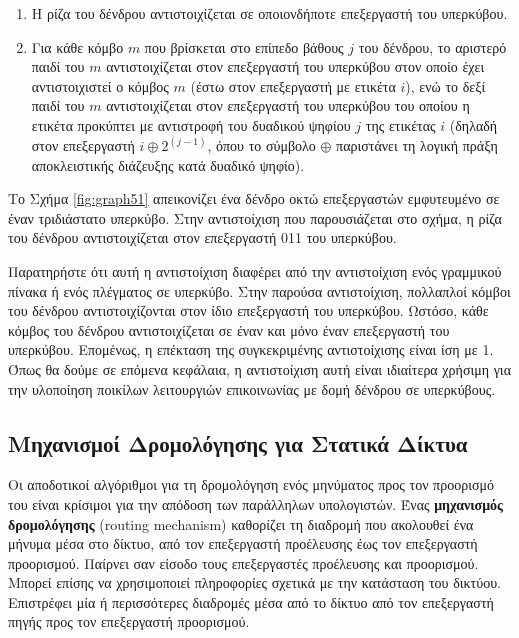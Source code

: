 \documentclass[12pt,a4paper]{article}
\begin{document}
\begin{enumerate}
\item Η ρίζα του δένδρου αντιστοιχίζεται σε οποιονδήποτε επεξεργαστή
του υπερκύβου.

\item Για κάθε κόμβο $m$ που βρίσκεται στο επίπεδο βάθους $j$ του δένδρου, 
το αριστερό παιδί του $m$ αντιστοιχίζεται στον επεξεργαστή του υπερκύβου 
στον οποίο έχει αντιστοιχιστεί ο κόμβος $m$ (έστω στον επεξεργαστή με 
ετικέτα $i$), ενώ το δεξί παιδί του $m$ αντιστοιχίζεται στον επεξεργαστή 
του υπερκύβου του οποίου η ετικέτα προκύπτει με αντιστροφή του δυαδικού 
ψηφίου $j$ της ετικέτας $i$ (δηλαδή στον επεξεργαστή $i \oplus 2^{(j-1)}$,
όπου το σύμβολο $\oplus$ παριστάνει τη λογική πράξη
αποκλειστικής διάζευξης κατά δυαδικό ψηφίο).
\end{enumerate}

\noindent Το Σχήμα \ref{fig:graph51} απεικονίζει ένα δένδρο οκτώ 
επεξεργαστών εμφυτευμένο σε έναν τριδιάστατο υπερκύβο. Στην 
αντιστοίχιση που παρουσιάζεται στο σχήμα, η ρίζα του δένδρου
αντιστοιχίζεται στον επεξεργαστή 011 του υπερκύβου.

Παρατηρήστε ότι αυτή η αντιστοίχιση διαφέρει από την αντιστοίχιση
ενός γραμμικού πίνακα ή ενός πλέγματος σε υπερκύβο. Στην παρούσα 
αντιστοίχιση, πολλαπλοί κόμβοι του δένδρου αντιστοιχίζονται στον ίδιο 
επεξεργαστή του υπερκύβου. Ωστόσο, κάθε κόμβος του δένδρου αντιστοιχίζεται 
σε έναν και μόνο έναν επεξεργαστή του υπερκύβου. Επομένως, η επέκταση 
της συγκεκριμένης αντιστοίχισης είναι ίση με 1. Όπως θα δούμε σε επόμενα 
κεφάλαια, η αντιστοίχιση αυτή είναι ιδιαίτερα χρήσιμη για την υλοποίηση 
ποικίλων λειτουργιών επικοινωνίας με δομή δένδρου σε υπερκύβους.

\subsection{Μηχανισμοί Δρομολόγησης για Στατικά Δίκτυα}
Οι αποδοτικοί αλγόριθμοι για τη δρομολόγηση ενός μηνύματος προς τον
προορισμό του είναι κρίσιμοι για την απόδοση των παράλληλων υπολογιστών.
Ένας \textbf{μηχανισμός δρομολόγησης} (\foreignlanguage{english}{routing mechanism})
καθορίζει τη διαδρομή που ακολουθεί ένα μήνυμα μέσα στο δίκτυο, από τον 
επεξεργαστή προέλευσης έως τον επεξεργαστή προορισμού. Παίρνει σαν είσοδο
τους επεξεργαστές προέλευσης και προορισμού. Μπορεί επίσης να χρησιμοποιεί 
πληροφορίες σχετικά με την κατάσταση του δικτύου. Επιστρέφει μία ή 
περισσότερες διαδρομές μέσα από το δίκτυο από τον επεξεργαστή πηγής προς 
τον επεξεργαστή προορισμού.
\end{document}
